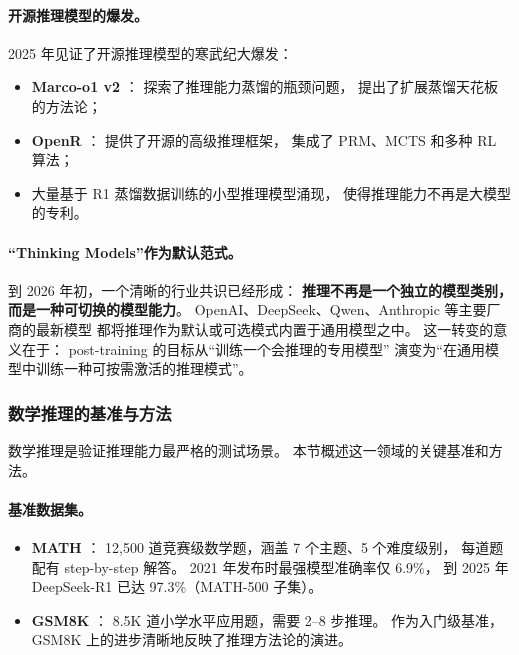 \paragraph{开源推理模型的爆发。}
2025 年见证了开源推理模型的寒武纪大爆发：
\begin{itemize}[leftmargin=2em]
  \item \textbf{Marco-o1 v2} \cite{yin2025marcoo1v2}：
    探索了推理能力蒸馏的瓶颈问题，
    提出了扩展蒸馏天花板的方法论；
  \item \textbf{OpenR} \cite{wang2024openr}：
    提供了开源的高级推理框架，
    集成了 PRM、MCTS 和多种 RL 算法；
  \item 大量基于 R1 蒸馏数据训练的小型推理模型涌现，
    使得推理能力不再是大模型的专利。
\end{itemize}

\paragraph{``Thinking Models''作为默认范式。}
到 2026 年初，一个清晰的行业共识已经形成：
\textbf{推理不再是一个独立的模型类别，而是一种可切换的模型能力}。
OpenAI、DeepSeek、Qwen、Anthropic 等主要厂商的最新模型
都将推理作为默认或可选模式内置于通用模型之中。
这一转变的意义在于：
post-training 的目标从``训练一个会推理的专用模型''
演变为``在通用模型中训练一种可按需激活的推理模式''。

\subsubsection{数学推理的基准与方法}
\label{sec:t4-math}

数学推理是验证推理能力最严格的测试场景。
本节概述这一领域的关键基准和方法。

\paragraph{基准数据集。}
\begin{itemize}[leftmargin=2em]
  \item \textbf{MATH} ：
    12,500 道竞赛级数学题，涵盖 7 个主题、5 个难度级别，
    每道题配有 step-by-step 解答。
    2021 年发布时最强模型准确率仅 6.9\%，
    到 2025 年 DeepSeek-R1 已达 97.3\%（MATH-500 子集）。

  \item \textbf{GSM8K} \cite{cobbe2021gsm8k}：
    8.5K 道小学水平应用题，需要 2--8 步推理。
    作为入门级基准，GSM8K 上的进步清晰地反映了推理方法论的演进。
\end{itemize}

